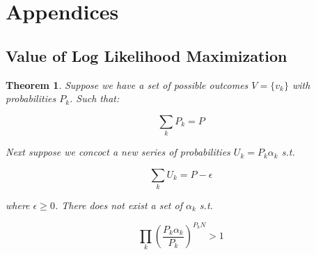 \documentclass[11pt]{article}
\newtheorem{theorem}{Theorem}
\begin{document}
\newpage

















































\section{Appendices}


\subsection{Value of Log Likelihood Maximization}

\begin{theorem}
Suppose we have a set of possible outcomes $V=\lbrace v_k \rbrace$ with probabilities $P_k$. Such that:

$$\sum_k P_k = P$$

Next suppose we concoct a new series of probabilities $U_k = P_k \alpha_k$ s.t. 

$$\sum_k U_k = P-\epsilon$$

where $\epsilon \geq 0$. There does not exist a set of $\alpha_k$ s.t.

$$\prod_k \left(\frac{P_k\alpha_k}{P_k}\right)^{P_kN}>1$$

\end{theorem}
\end{document}
